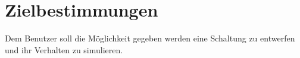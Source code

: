 \section{Zielbestimmungen}


Dem Benutzer soll die Möglichkeit gegeben werden eine Schaltung zu entwerfen und ihr Verhalten zu simulieren.
